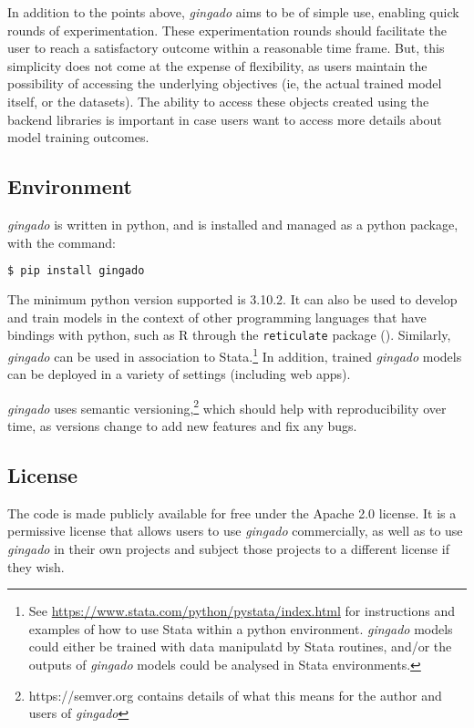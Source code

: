 \documentclass{article}
\begin{document}
In addition to the points above, \textit{gingado} aims to be of simple use, enabling quick rounds of experimentation. These experimentation rounds should facilitate the user to reach a satisfactory outcome within a reasonable time frame. But, this simplicity does not come at the expense of flexibility, as users maintain the possibility of accessing the underlying objectives (ie, the actual trained model itself, or the datasets). The ability to access these objects created using the backend libraries is important in case users want to access more details about model training outcomes.


\subsection{Environment}

\textit{gingado} is written in python, and is installed and managed as a python package, with the command:
\begin{lstlisting}[language=bash, caption = Installing \textit{gingado}, frame=single]
$ pip install gingado
\end{lstlisting}

The minimum python version supported is 3.10.2. It can also be used to develop and train models in the context of other programming languages that have bindings with python, such as R through the \texttt{reticulate} package (\cite{reticulate}). Similarly, \textit{gingado} can be used in association to Stata.\footnote{See \url{https://www.stata.com/python/pystata/index.html} for instructions and examples of how to use Stata within a python environment. \textit{gingado} models could either be trained with data manipulatd by Stata routines, and/or the outputs of \textit{gingado} models could be analysed in Stata environments.} In addition, trained \textit{gingado} models can be deployed in a variety of settings (including web apps).

\textit{gingado} uses semantic versioning,\footnote{https://semver.org contains details of what this means for the author and users of \textit{gingado}} which should help with reproducibility over time, as versions change to add new features and fix any bugs.

\subsection{License}

The code is made publicly available for free under the Apache 2.0 license. It is a permissive license that allows users to use \textit{gingado} commercially, as well as to use \textit{gingado} in their own projects and subject those projects to a different license if they wish.
\end{document}
